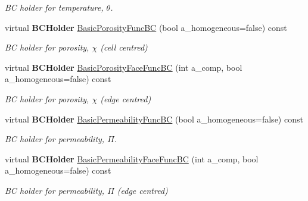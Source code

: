 \begin{DoxyCompactItemize}
\begin{DoxyCompactList}\small\item\em BC holder for temperature, $ \theta $. \end{DoxyCompactList}\item 
\mbox{\label{class_phys_b_c_util_a1cd0685d8dd435f2b4dc4144bffbb58a}} 
virtual \textbf{ B\+C\+Holder} \hyperlink{class_phys_b_c_util_a1cd0685d8dd435f2b4dc4144bffbb58a}{Basic\+Porosity\+Func\+BC} (bool a\+\_\+homogeneous=false) const
\begin{DoxyCompactList}\small\item\em BC holder for porosity, $ \chi $ (cell centred) \end{DoxyCompactList}\item 
\mbox{\label{class_phys_b_c_util_aa1d2160b38d8766327ad37d9200e733f}} 
virtual \textbf{ B\+C\+Holder} \hyperlink{class_phys_b_c_util_aa1d2160b38d8766327ad37d9200e733f}{Basic\+Porosity\+Face\+Func\+BC} (int a\+\_\+comp, bool a\+\_\+homogeneous=false) const
\begin{DoxyCompactList}\small\item\em BC holder for porosity, $ \chi $ (edge centred) \end{DoxyCompactList}\item 
\mbox{\label{class_phys_b_c_util_aa62c80d941738f11eb7d2374eb6f95cd}} 
virtual \textbf{ B\+C\+Holder} \hyperlink{class_phys_b_c_util_aa62c80d941738f11eb7d2374eb6f95cd}{Basic\+Permeability\+Func\+BC} (bool a\+\_\+homogeneous=false) const
\begin{DoxyCompactList}\small\item\em BC holder for permeability, $ \Pi $. \end{DoxyCompactList}\item 
\mbox{\label{class_phys_b_c_util_a4a1811075fb4db677b759007eedfea1f}} 
virtual \textbf{ B\+C\+Holder} \hyperlink{class_phys_b_c_util_a4a1811075fb4db677b759007eedfea1f}{Basic\+Permeability\+Face\+Func\+BC} (int a\+\_\+comp, bool a\+\_\+homogeneous=false) const
\begin{DoxyCompactList}\small\item\em BC holder for permeability, $ \Pi $ (edge centred) \end{DoxyCompactList}\item 

\end{DoxyCompactItemize}
